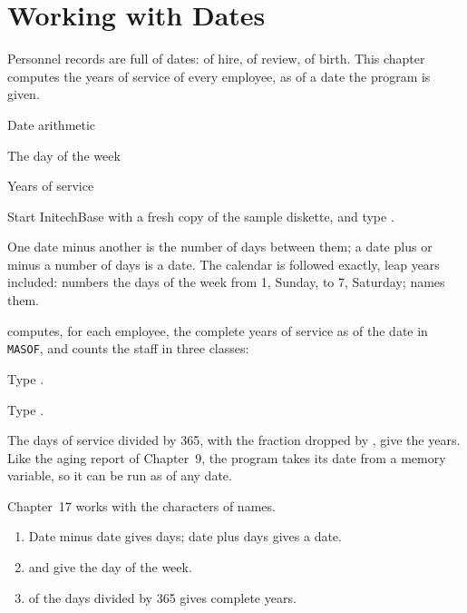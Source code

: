 \chapter{Working with Dates}
Personnel records are full of dates: of hire, of review, of birth.  This
chapter computes the years of service of every employee, as of a date the
program is given.

\begin{ChapterCovers}
\item Date arithmetic
\item The day of the week
\item Years of service
\end{ChapterCovers}

Start InitechBase with a fresh copy of the sample diskette, and type
.

One date minus another is the number of days between them; a date plus or
minus a number of days is a date.  The calendar is followed exactly, leap years
included:
 numbers the days of the week from 1, Sunday, to 7, Saturday;
 names them.

 computes, for each employee, the complete years of service
as of the date in \texttt{MASOF}, and counts the staff in three classes:
\begin{Steps}
\item Type .
\item Type .
\end{Steps}
The days of service divided by 365, with the fraction dropped by ,
give the years.  Like the aging report of Chapter~9, the program takes its date
from a memory variable, so it can be run as of any date.

Chapter~17 works with the characters of names.

\begin{enumerate}
\item Date minus date gives days; date plus days gives a date.
\item {} and  give the day of the week.
\item {} of the days divided by 365 gives complete years.
\end{enumerate}
